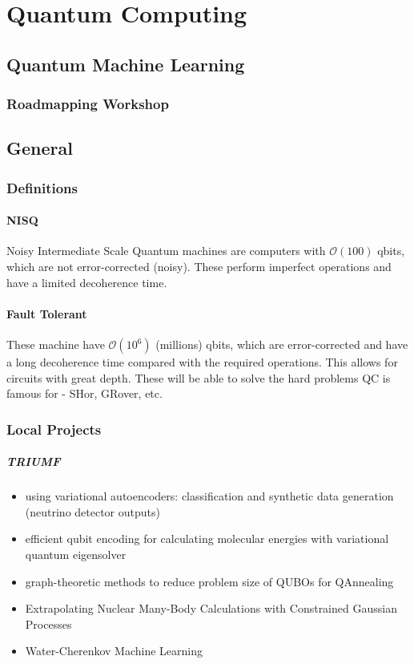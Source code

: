 \chapter[Quantum Computing]{Quantum Computing}
\label{ch:quacom}

\section{Quantum Machine Learning}
\subsection{Roadmapping Workshop}
 

\section{General}

\subsection{Definitions}
\subsubsection{NISQ} 
Noisy Intermediate Scale Quantum machines are computers with $\mathcal{O}(100)$
qbits, which are not error-corrected (noisy). These perform imperfect
operations and have a limited decoherence time.

\subsubsection{Fault Tolerant } 
These machine have $\mathcal{O}(10^{6})$ (millions) qbits, which are
error-corrected and have a long decoherence time compared with the required
operations. This allows for circuits with great depth. These will be able to
solve the hard problems QC is famous for - SHor, GRover, etc.

\subsection{Local Projects}
\paragraph{TRIUMF}
\begin{itemize}
  \item using variational autoencoders: classification and synthetic data generation (neutrino detector outputs)
  \item efficient qubit encoding for calculating molecular energies with variational quantum eigensolver
  \item graph-theoretic methods to reduce problem size of QUBOs for QAnnealing
  \item Extrapolating Nuclear Many-Body Calculations with Constrained Gaussian Processes
  \item Water-Cherenkov Machine Learning
\end{itemize}


